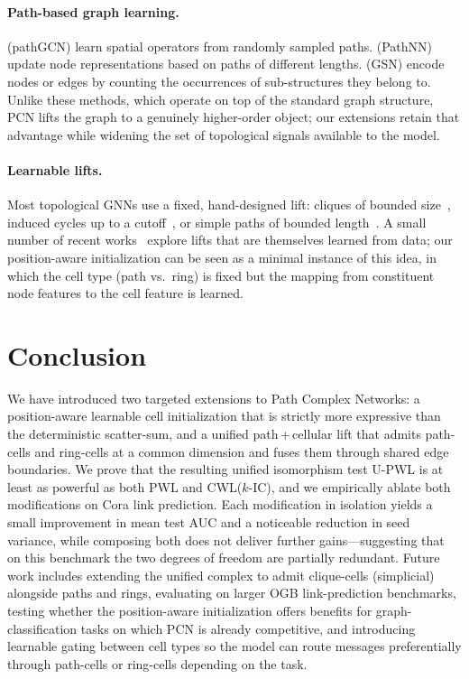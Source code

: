 \documentclass{article}
\begin{document}
\paragraph{Path-based graph learning.}
\citet{eliasof_pathgcn_2022} (pathGCN) learn spatial operators from randomly sampled paths. \citet{michel_expressive_2023} (PathNN) update node representations based on paths of different lengths. \citet{bouritsas_improving_2021} (GSN) encode nodes or edges by counting the occurrences of sub-structures they belong to. Unlike these methods, which operate on top of the standard graph structure, PCN lifts the graph to a genuinely higher-order object; our extensions retain that advantage while widening the set of topological signals available to the model.

\paragraph{Learnable lifts.}
Most topological GNNs use a fixed, hand-designed lift: cliques of bounded size~\citep{bodnar_weisfeiler_2021}, induced cycles up to a cutoff~\citep{bodnar_weisfeiler_2022}, or simple paths of bounded length~\citep{truong_weisfeiler_2024}. A small number of recent works~\citep{hajij_topological_2023} explore lifts that are themselves learned from data; our position-aware initialization can be seen as a minimal instance of this idea, in which the cell type (path vs.\ ring) is fixed but the mapping from constituent node features to the cell feature is learned.

\section{Conclusion}
\label{section:conclusion}
We have introduced two targeted extensions to Path Complex Networks: a position-aware learnable cell initialization that is strictly more expressive than the deterministic scatter-sum, and a unified path\,+\,cellular lift that admits path-cells and ring-cells at a common dimension and fuses them through shared edge boundaries. We prove that the resulting unified isomorphism test U-PWL is at least as powerful as both PWL and CWL($k$-IC), and we empirically ablate both modifications on Cora link prediction. Each modification in isolation yields a small improvement in mean test AUC and a noticeable reduction in seed variance, while composing both does not deliver further gains---suggesting that on this benchmark the two degrees of freedom are partially redundant. Future work includes extending the unified complex to admit clique-cells (simplicial) alongside paths and rings, evaluating on larger OGB link-prediction benchmarks, testing whether the position-aware initialization offers benefits for graph-classification tasks on which PCN is already competitive, and introducing learnable gating between cell types so the model can route messages preferentially through path-cells or ring-cells depending on the task.
\end{document}
